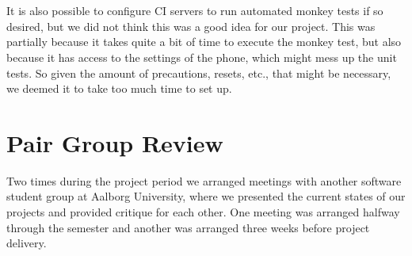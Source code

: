 \\\\
It is also possible to configure CI servers to run automated monkey tests if so desired, but we did not think this was a good idea for our project. This was partially because it takes quite a bit of time to execute the monkey test, but also because it has access to the settings of the phone, which might mess up the unit tests. So given the amount of precautions, resets, etc., that might be necessary, we deemed it to take too much time to set up. 

\section{Pair Group Review}
\label{sec:pair_group_review}

Two times during the project period we arranged meetings with another software student group at Aalborg University, where we presented the current states of our projects and provided critique for each other. One meeting was arranged halfway through the semester and another was arranged three weeks before project delivery.
\\\\
